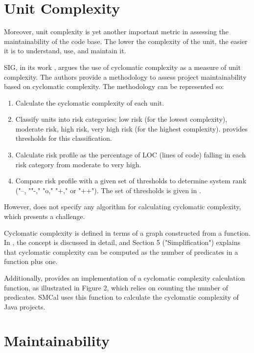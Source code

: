 \documentclass[11pt]{report}
\begin{document}
\section{Unit Complexity}
\label{sec:unit-complexity}

Moreover, unit complexity is yet another important metric in assessing the maintainability of the code base. The lower the complexity of the unit, the easier it is to understand, use, and maintain it.

SIG, in its work \cite{Heitlager2007}, argues the use of cyclomatic complexity as a measure of unit complexity. The authors provide a methodology to assess project maintainability based on cyclomatic complexity. The methodology can be represented so:
\begin{enumerate}
\item Calculate the cyclomatic complexity of each unit.
\item Classify units into risk categories:
    low risk (for the lowest complexity),
    moderate risk,
    high risk,
    very high risk (for the highest complexity). \cite{Heitlager2007} provides thresholds for this classification.
\item Calculate risk profile as the percentage of LOC (lines of code) falling in each risk category from moderate to very high.
\item Compare risk profile with a given set of thresholds to determine system rank ("--, ""-," "o," "+," or "++"). The set of thresholds is given in \cite{Heitlager2007}.
\end{enumerate}

However, \cite{Heitlager2007} does not specify any algorithm for calculating cyclomatic complexity, which presents a challenge.


Cyclomatic complexity is defined in terms of a graph constructed from a function. In \cite{McCabe1976}, the concept is discussed in detail, and Section 5 ("Simplification") explains that cyclomatic complexity can be computed as the number of predicates in a function plus one.

Additionally, \cite{landman2016empirical} provides an implementation of a cyclomatic complexity calculation function, as illustrated in Figure 2, which relies on counting the number of predicates. SMCal uses this function to calculate the cyclomatic complexity of Java projects.

\section{Maintainability}
\label{sec:maintainability}
\end{document}
